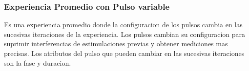 \subsubsection{Experiencia Promedio con Pulso variable}
Es una experiencia promedio donde la configuracion de los pulsos cambia en las sucesivas iteraciones de la experiencia.
Los pulsos cambian su configuracion para suprimir interferencias de estimulaciones previas y obtener mediciones
mas precisas. Los atributos del pulso que pueden cambiar en las sucesivas iteraciones son la fase y duracion. 

\newpage